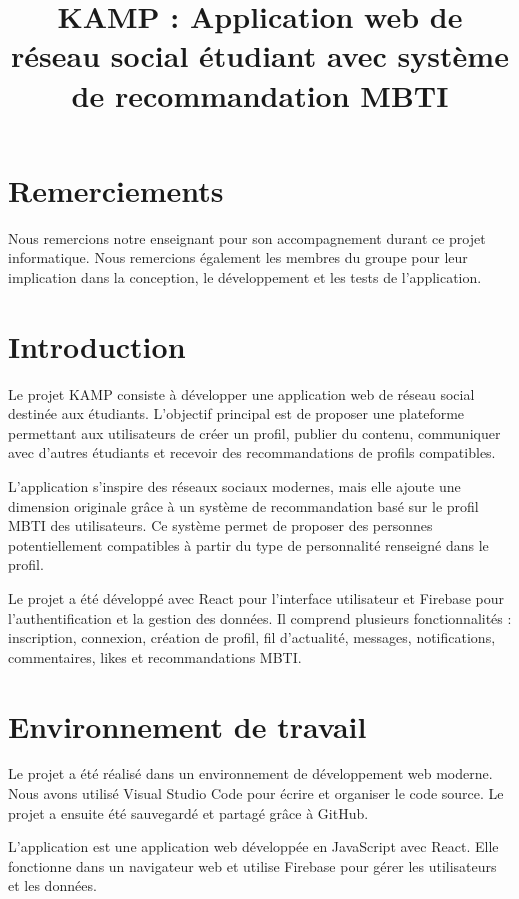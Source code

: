 \documentclass[a4paper, 12pt, twoside]{article}
\title{KAMP : Application web de réseau social étudiant avec système de recommandation MBTI}
\begin{document}
\pagedegarde

\section*{Remerciements}

Nous remercions notre enseignant pour son accompagnement durant ce projet informatique. 
Nous remercions également les membres du groupe pour leur implication dans la conception, le développement et les tests de l'application.

\newpage

\tableofcontents
\newpage

\section{Introduction}

Le projet KAMP consiste à développer une application web de réseau social destinée aux étudiants. 
L'objectif principal est de proposer une plateforme permettant aux utilisateurs de créer un profil, publier du contenu, communiquer avec d'autres étudiants et recevoir des recommandations de profils compatibles.

L'application s'inspire des réseaux sociaux modernes, mais elle ajoute une dimension originale grâce à un système de recommandation basé sur le profil MBTI des utilisateurs. 
Ce système permet de proposer des personnes potentiellement compatibles à partir du type de personnalité renseigné dans le profil.

Le projet a été développé avec React pour l'interface utilisateur et Firebase pour l'authentification et la gestion des données. 
Il comprend plusieurs fonctionnalités : inscription, connexion, création de profil, fil d'actualité, messages, notifications, commentaires, likes et recommandations MBTI.

\section{Environnement de travail}

Le projet a été réalisé dans un environnement de développement web moderne. 
Nous avons utilisé Visual Studio Code pour écrire et organiser le code source. 
Le projet a ensuite été sauvegardé et partagé grâce à GitHub.

L'application est une application web développée en JavaScript avec React. 
Elle fonctionne dans un navigateur web et utilise Firebase pour gérer les utilisateurs et les données.
\end{document}
